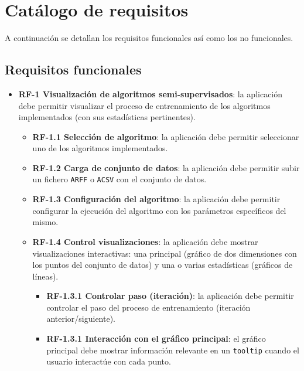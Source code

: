 \section{Catálogo de requisitos}


A continuación se detallan los requisitos funcionales así como los no
funcionales.

\subsection{Requisitos funcionales}

\begin{itemize}
	\item \textbf{RF-1 Visualización de algoritmos semi-supervisados}: la
	aplicación debe permitir visualizar el proceso de entrenamiento de los
	algoritmos implementados (con sus estadísticas pertinentes).
    \begin{itemize}
        \item \textbf{RF-1.1 Selección de algoritmo}: la aplicación debe
        permitir seleccionar uno de los algoritmos implementados.
        \item \textbf{RF-1.2 Carga de conjunto de datos}: la aplicación debe
        permitir subir un fichero \texttt{ARFF} o \texttt{ACSV} con el conjunto
        de datos. 
        \item \textbf{RF-1.3 Configuración del algoritmo}: la aplicación debe
        permitir configurar la ejecución del algoritmo con los parámetros
        específicos del mismo.
        \item \textbf{RF-1.4 Control visualizaciones}: la aplicación debe
        mostrar visualizaciones interactivas: una principal (gráfico de dos
        dimensiones con los puntos del conjunto de datos) y una o varias
        estadísticas (gráficos de líneas).
        \begin{itemize}
            \item \textbf{RF-1.3.1 Controlar paso (iteración)}: la aplicación
            debe permitir controlar el paso del proceso de entrenamiento
            (iteración anterior/siguiente).
            \item \textbf{RF-1.3.1 Interacción con el gráfico principal}: el
            gráfico principal debe mostrar información relevante en un
            \texttt{tooltip} cuando el usuario interactúe con cada punto.
        \end{itemize}
    \end{itemize}
    

\end{itemize}
